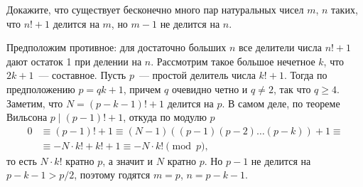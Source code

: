 Докажите, что существует бесконечно много пар натуральных чисел $m$, $n$ таких,
что $n! + 1$ делится на $m$, но $m - 1$ не делится на $n$.

\solution
Предположим противное: для достаточно больших $n$ все делители числа $n! + 1$
дают остаток 1 при делении на $n$.
Рассмотрим такое большое нечетное $k$, что $2 k + 1$~--- составное.
Пусть $p$~--- простой делитель числа $k! + 1$.
Тогда по предположению $p = q k + 1$, причем $q$ очевидно четно и $q \neq 2$,
так что $q \geq 4$.
Заметим, что $N = (p - k - 1)! + 1$ делится на $p$.
В самом деле, по теореме Вильсона $p \mid (p - 1)! + 1$, откуда по модулю $p$
\begin{align*}
    0
&\equiv
    (p - 1)! + 1
\equiv
    (N - 1) ((p - 1) (p - 2) \ldots (p - k)) + 1
\equiv\\&\equiv
    -N \cdot k! + k! + 1
\equiv
    -N \cdot k!
\pmod{p},
\end{align*}
то есть $N \cdot k!$ кратно $p$, а значит и $N$ кратно $p$.
Но $p - 1$ не делится на $p - k - 1 > p / 2$, поэтому годятся
$m = p$, $n = p - k - 1$.


